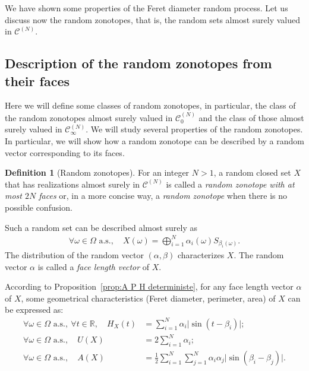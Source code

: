 \documentclass[numbers,compress,v1.0.1]{vmsta}
\theoremstyle{definition}
\newtheorem{definition}{Definition}
\begin{document}
We have shown some properties of the Feret diameter random process. Let
us discuss now the random zonotopes, that is, the random sets almost
surely valued in $\mathcal{C}^{(N)}$.

\subsection{Description of the random zonotopes from their faces}

Here we will define some classes of random zonotopes, in particular,
the class of the random zonotopes almost surely valued in $ \mathcal
{C}^{(N)}_0$ and the class of those almost surely valued in $ \mathcal
{C}^{(N)}_\infty$. We will study several properties of the random
zonotopes. In particular, we will show how a random zonotope can be
described by a random vector corresponding to its faces.
%
\begin{definition}[Random zonotopes]
For an integer $N>1$, a random closed set $X$ that has realizations
almost surely in $\mathcal{C}^{(N)}$ is called a \textit{random
zonotope with at most $2N$ faces} or, in a more concise way, a \textit
{random zonotope} when there is no possible confusion.
\end{definition}
%
Such a random set can be described almost surely as
%
\begin{align*}
\forall\omega\in\varOmega\text{ a.s.},\quad X(\omega)=\bigoplus
_{i=1}^{N}\alpha_i(\omega)S_{\beta_i(\omega)}.
\end{align*}
%
The distribution of the random vector $(\alpha,\beta)$ characterizes
$X$. The random vector $\alpha$ is called a \textit{face length vector}
of $X$.

According to Proposition~\ref{prop:A P H deterministe}, for any face
length vector $\alpha$ of $X$, some geometrical characteristics (Feret
diameter, perimeter, area) of $X$ can be expressed as:
%
\begin{align}
\forall\omega\in\varOmega\text{ a.s.},\ \forall t\in\mathbb{R},\quad  H_{X}(t)&=\sum_{i=1}^N \alpha_i\bigl\vert\sin(t-\beta_i )\bigr\vert; \label{eq:FeretRZ}\\
\forall\omega\in\varOmega\text{ a.s.},\quad U(X)&=2\sum_{i=1}^N\alpha_i; \label{eq:PerimeterRZ}\\
\forall\omega\in\varOmega\text{ a.s.},\quad A(X)&=\frac{1}{2}\sum_{i=1}^N \sum_{j=1}^N\alpha_i\alpha_j\bigl\vert\sin(\beta_i-\beta_j)\bigr\vert. \label{eq:AreaRZ}
\end{align}
\end{document}

